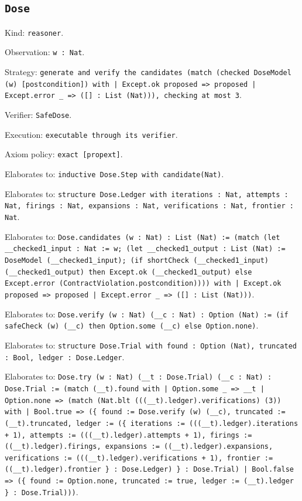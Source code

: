 \documentclass[11pt]{article}
\begin{document}
\subsection*{\texttt{Dose}}
\noindent Kind: \texttt{reasoner}.\par
\noindent Observation: \texttt{w : Nat}.\par
\noindent Strategy: \texttt{generate and verify the candidates (match (checked DoseModel (w) [postcondition]) with | Except.ok proposed => proposed | Except.error \_ => ([] : List (Nat))), checking at most 3}.\par
\noindent Verifier: \texttt{SafeDose}.\par
\noindent Execution: \texttt{executable through its verifier}.\par
\noindent Axiom policy: \texttt{exact [propext]}.\par
\noindent Elaborates to: \texttt{inductive Dose.Step with candidate(Nat)}.\par
\noindent Elaborates to: \texttt{structure Dose.Ledger with iterations : Nat, attempts : Nat, firings : Nat, expansions : Nat, verifications : Nat, frontier : Nat}.\par
\noindent Elaborates to: \texttt{Dose.candidates (w : Nat) : List (Nat) := (match (let \_\_checked1\_input : Nat := w; (let \_\_checked1\_output : List (Nat) := DoseModel (\_\_checked1\_input); (if shortCheck (\_\_checked1\_input) (\_\_checked1\_output) then Except.ok (\_\_checked1\_output) else Except.error (ContractViolation.postcondition)))) with | Except.ok proposed => proposed | Except.error \_ => ([] : List (Nat)))}.\par
\noindent Elaborates to: \texttt{Dose.verify (w : Nat) (\_\_c : Nat) : Option (Nat) := (if safeCheck (w) (\_\_c) then Option.some (\_\_c) else Option.none)}.\par
\noindent Elaborates to: \texttt{structure Dose.Trial with found : Option (Nat), truncated : Bool, ledger : Dose.Ledger}.\par
\noindent Elaborates to: \texttt{Dose.try (w : Nat) (\_\_t : Dose.Trial) (\_\_c : Nat) : Dose.Trial := (match (\_\_t).found with | Option.some \_ => \_\_t | Option.none => (match (Nat.blt (((\_\_t).ledger).verifications) (3)) with | Bool.true => (\{ found := Dose.verify (w) (\_\_c), truncated := (\_\_t).truncated, ledger := (\{ iterations := (((\_\_t).ledger).iterations + 1), attempts := (((\_\_t).ledger).attempts + 1), firings := ((\_\_t).ledger).firings, expansions := ((\_\_t).ledger).expansions, verifications := (((\_\_t).ledger).verifications + 1), frontier := ((\_\_t).ledger).frontier \} : Dose.Ledger) \} : Dose.Trial) | Bool.false => (\{ found := Option.none, truncated := true, ledger := (\_\_t).ledger \} : Dose.Trial)))}.\par
\end{document}
